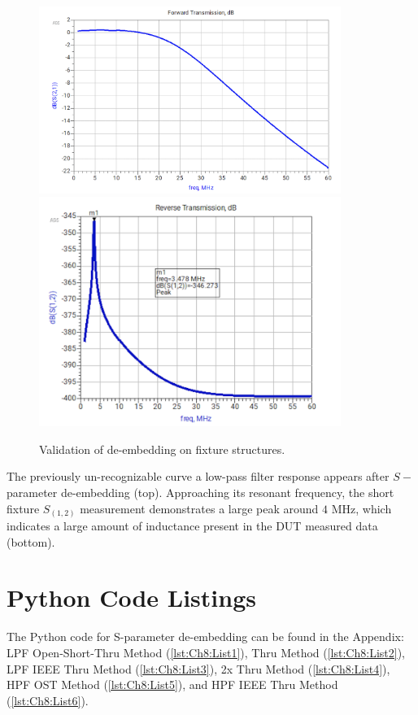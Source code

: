 \begin{figure}[H]
\centering
\includegraphics[width=0.875\textwidth]{Chapter_8/images/Lab_08_LPF_OST_S21.png}
\includegraphics[width=0.875\textwidth]{Chapter_8/images/Lab_08_DeEmbed_Short_2.png}
\caption{Validation of de-embedding on fixture structures.}
\label{Ch8_fig:11}
\end{figure}
\par
The previously un-recognizable curve a low-pass filter response appears after $S-$parameter de-embedding (top). Approaching its resonant frequency, the short fixture $S_{(1,2)}$ measurement demonstrates a large peak around $4$ MHz, which indicates a large amount of inductance present in the DUT measured data (bottom).
\FloatBarrier
\newpage

\section{Python Code Listings}

The Python code for S-parameter de-embedding can be found in the Appendix: LPF Open-Short-Thru Method (\cref{lst:Ch8:List1}), Thru Method (\cref{lst:Ch8:List2}), LPF IEEE Thru Method (\cref{lst:Ch8:List3}), 2x Thru Method (\cref{lst:Ch8:List4}), HPF OST Method (\cref{lst:Ch8:List5}), and HPF IEEE Thru Method (\cref{lst:Ch8:List6}).

